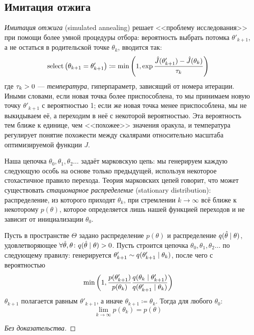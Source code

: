 \subsection{Имитация отжига}

\emph{Имитация отжига} (simulated annealing) решает <<проблему исследования>> при помощи более умной процедуры отбора: вероятность выбрать потомка $\theta'_{k+1}$, а не остаться в родительской точке $\theta_k$, вводится так:
$$\mathrm{select} \left( \theta_{k+1} = \theta'_{k+1} \right) \coloneqq \min \left(1, \exp{\frac{\hat{J}(\theta'_{k+1}) - \hat{J}(\theta_k)}{\tau_k}} \right)$$
где $\tau_k \HM> 0$ --- \emph{температура}, гиперпараметр, зависящий от номера итерации. Иными словами, если новая точка более приспособлена, то мы принимаем новую точку $\theta'_{k+1}$ с вероятностью 1; если же новая точка менее приспособлена, мы не выкидываем её, а переходим в неё с некоторой вероятностью. Эта вероятность тем ближе к единице, чем <<похожее>> значения оракула, и температура регулирует понятие похожести между скалярами относительно масштаба оптимизируемой функции $J$.

Наша цепочка $\theta_0, \theta_1, \theta_2 \dots$ задаёт марковскую цепь: мы генерируем каждую следующую особь на основе только предыдущей, используя некоторое стохастичное правило перехода. Теория марковских цепей говорит, что может существовать \emph{стационарное распределение} (stationary distribution): распределение, из которого приходят $\theta_k$, при стремлении $k \to \infty$ всё ближе к некоторому $p(\theta)$, которое определяется лишь нашей функцией переходов и не зависит от инициализации $\theta_0$.

\begin{theorem}
Пусть в пространстве $\Theta$ задано распределение $p(\theta)$ и распределение $q(\hat{\theta} \HM\mid \theta)$, удовлетворяющее $\forall \hat{\theta}, \theta \colon q(\hat{\theta} \HM\mid \theta) > 0$. Пусть строится цепочка $\theta_0, \theta_1, \theta_2 \dots$ по следующему правилу: генерируется $\theta'_{k+1} \HM\sim q(\theta'_{k+1} \HM\mid \theta_k)$, после чего с вероятностью
$$\min \left( 1, \frac{p(\theta'_{k+1})}{p(\theta_{k})}\frac{q(\theta_k \HM\mid \theta'_{k+1})}{q(\theta'_{k+1} \HM\mid \theta_{k})} \right)$$
$\theta_{k+1}$ полагается равным $\theta'_{k+1}$, а иначе $\theta_{k+1} \coloneqq \theta_k$.
Тогда для любого $\theta_0$:
$$\lim_{k \to \infty} p(\theta_k) = p(\theta)$$
\begin{proof}[Без доказательства]
\end{proof}
\end{theorem}


